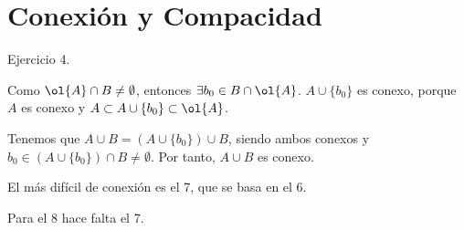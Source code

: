 \section{Conexión y Compacidad}

\begin{ejercicio}
    Ejercicio 4.

    Como $\ol{A}\cap B\neq \emptyset$, entonces $\exists b_0\in B\cap \ol{A}$. $A\cup \{b_0\}$ es conexo, porque $A$ es conexo y $A\subset A\cup \{b_0\}\subset \ol{A}$.

    Tenemos que $A\cup B = \left(A\cup \{b_0\}\right)\cup B$, siendo ambos conexos y $b_0\in \left(A\cup \{b_0\}\right)\cap B\neq \emptyset$. Por tanto, $A\cup B$ es conexo. 
\end{ejercicio}



El más difícil de conexión es el 7, que se basa en el 6.

Para el 8 hace falta el 7.

\begin{ejercicio}
    
\end{ejercicio}